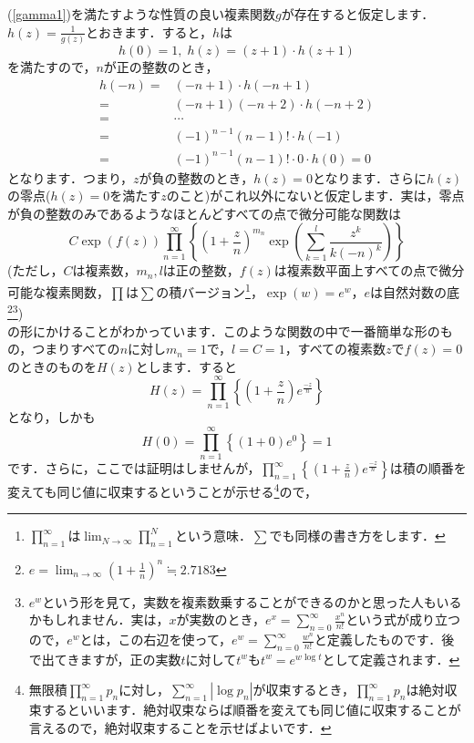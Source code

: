 \documentclass[./main]{subfile}
\begin{document}
(\ref{gamma1})を満たすような性質の良い複素関数$g$が存在すると仮定します．$h(z)=\frac{1}{g(z)}$とおきます．すると，$h$は
\begin{equation}\label{invg}
h(0)=1,\;h(z)=(z+1)\cdot h(z+1)
\end{equation}
を満たすので，$n$が正の整数のとき，
\begin{align*}
h(-n)=&(-n+1)\cdot h(-n+1)\\
=&(-n+1)(-n+2)\cdot h(-n+2)\\
=&\cdots\\
=&(-1)^{n-1}(n-1)!\cdot h(-1)\\
=&(-1)^{n-1}(n-1)!\cdot0\cdot h(0)=0
\end{align*}
となります．つまり，$z$が負の整数のとき，$h(z)=0$となります．さらに$h(z)$の零点($h(z)=0$を満たす$z$のこと)がこれ以外にないと仮定します．実は，零点が負の整数のみであるようなほとんどすべての点で微分可能な関数は
\[
C\exp(f(z))\prod_{n=1}^{\infty}\left\{\left(1+\frac{z}{n}\right)^{m_n}\exp\left(\sum_{k=1}^l\frac{z^k}{k(-n)^k}\right)\right\}
\]
(ただし，$C$は複素数，$m_n,l$は正の整数，$f(z)$は複素数平面上すべての点で微分可能な複素関数，$\prod$は$\sum$の積バージョン\footnote{$\prod_{n=1}^{\infty}$は$\lim_{N\to\infty}\prod_{n=1}^N$という意味．$\sum$でも同様の書き方をします．}，$\exp(w)=e^w$，$e$は自然対数の底\footnote{$e=\lim_{n\to\infty}\left(1+\frac{1}{n}\right)^n\fallingdotseq 2.7183$}\footnote{$e^w$という形を見て，実数を複素数乗することができるのかと思った人もいるかもしれません．実は，$x$が実数のとき，$e^x=\sum_{n=0}^{\infty}\frac{x^n}{n!}$という式が成り立つので，$e^w$とは，この右辺を使って，$e^w=\sum_{n=0}^{\infty}\frac{w^n}{n!}$と定義したものです．後で出てきますが，正の実数$t$に対して$t^w$も$t^w=e^{w\log t}$として定義されます．})\\
の形にかけることがわかっています．このような関数の中で一番簡単な形のもの，つまりすべての$n$に対し$m_n=1$で，$l=C=1$，すべての複素数$z$で$f(z)=0$のときのものを$H(z)$とします．すると
\[
H(z)=\prod_{n=1}^{\infty}\left\{\left(1+\frac{z}{n}\right)e^{\frac{-z}{n}}\right\}
\]
となり，しかも
\[
H(0)=\prod_{n=1}^{\infty}\left\{(1+0)e^0\right\}=1
\]
です．さらに，ここでは証明はしませんが，$\prod_{n=1}^{\infty}\left\{\left(1+\frac{z}{n}\right)e^{\frac{-z}{n}}\right\}$は積の順番を変えても同じ値に収束するということが示せる\footnote{無限積$\prod_{n=1}^{\infty}p_n$に対し，$\sum_{n=1}^{\infty}|\log p_n|$が収束するとき，$\prod_{n=1}^{\infty}p_n$は絶対収束するといいます．絶対収束ならば順番を変えても同じ値に収束することが言えるので，絶対収束することを示せばよいです．}ので，
\end{document}
